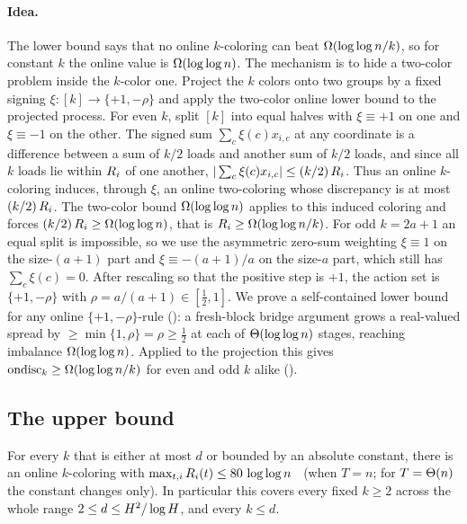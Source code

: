 \paragraph{Idea.}
The lower bound says that no online $k$-coloring can beat $\Omega(\log\log n/k)$, so for constant $k$ the online value is
$\Omega(\log\log n)$. The mechanism is to hide a two-color problem inside the $k$-color one. Project the $k$ colors onto two
groups by a fixed signing $\xi:[k]\to\{+1,-\rho\}$ and apply the two-color online lower bound \cite{AT2025} to the projected
process. For even $k$, split $[k]$ into equal halves with $\xi\equiv+1$ on one and $\xi\equiv-1$ on the other. The signed sum
$\sum_c\xi(c)x_{i,c}$ at any coordinate is a difference between a sum of $k/2$ loads and another sum of $k/2$ loads, and since
all $k$ loads lie within $R_i$ of one another, $|\sum_c\xi(c)x_{i,c}|\le (k/2)\,R_i$. Thus an online
$k$-coloring induces, through $\xi$, an online two-coloring whose discrepancy is at most $(k/2)\,R_i$. The two-color
bound $\Omega(\log\log n)$ applies to this induced coloring and forces $(k/2)\,R_i\ge\Omega(\log\log n)$, that is
$R_i\ge\Omega(\log\log n/k)$. For odd $k=2a+1$ an equal split is impossible, so we use the asymmetric zero-sum weighting
$\xi\equiv 1$ on the size-$(a+1)$ part and $\xi\equiv -(a+1)/a$ on the size-$a$ part, which still has $\sum_c\xi(c)=0$. After
rescaling so that the positive step is $+1$, the action set is $\{+1,-\rho\}$ with $\rho=a/(a+1)\in[\tfrac12,1]$. We prove a
self-contained lower bound for any online $\{+1,-\rho\}$-rule (): a fresh-block bridge argument grows a
real-valued spread by $\ge\min\{1,\rho\}=\rho\ge\tfrac12$ at each of $\Theta(\log\log n)$ stages, reaching imbalance
$\Omega(\log\log n)$. Applied to the projection this gives $\mathrm{ondisc}_k\ge\Omega(\log\log n/k)$ for even and odd $k$ alike
().

\subsection{The upper bound}\label{sec:online-upper}

\begin{lemma}\label{lem:online-upper}
For every $k$ that is either at most $d$ or bounded by an absolute constant, there is an online $k$-coloring with
$\max_{t,i}R_i(t)\le 80\,\log\log n$ \whp\ (when $T=n$; for $T=\Theta(n)$ the constant changes only). In particular this
covers every fixed $k\ge2$ across the whole range $2\le d\le H^2/\log H$, and every $k\le d$.
\end{lemma}

